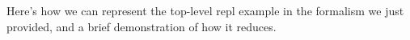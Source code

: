 
Here's how we can represent the top-level repl example in the
formalism we just provided, and a brief demonstration of how it
reduces.
